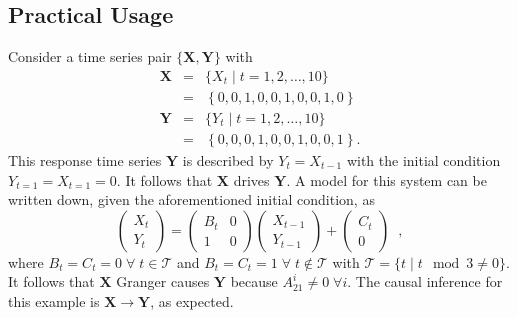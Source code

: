 \subsection{Practical Usage}
Consider a time series pair $\{\mathbf{X},\mathbf{Y}\}$ with
\begin{eqnarray*}
\mathbf{X} &=& \{X_t\; | \; t=1,2,\ldots,10\}\\
&=& \left\{0,0,1,0,0,1,0,0,1,0\right\}\\
\mathbf{Y} &=& \{Y_t\; | \; t=1,2,\ldots,10\}\\
&=& \left\{0,0,0,1,0,0,1,0,0,1\right\}.
\end{eqnarray*}
This response time series $\mathbf{Y}$ is described by $Y_t=X_{t-1}$ with the initial condition $Y_{t=1}=X_{t=1}=0$.  It follows that $\mathbf{X}$ drives $\mathbf{Y}$.  A model for this system can be written down, given the aforementioned initial condition, as
\begin{equation}
\label{eqn:GCsimpleex}
\begin{pmatrix}
X_t \\ 
Y_t
\end{pmatrix} = \begin{pmatrix}
B_t & 0\\
1 & 0
\end{pmatrix}\begin{pmatrix}
X_{t-1} \\ 
Y_{t-1}
\end{pmatrix}+
\begin{pmatrix}
C_t \\ 
0
\end{pmatrix}\;\;,
\end{equation}
where $B_t = C_t = 0\;\forall\;t\in \mathcal{T}$ and $B_t = C_t = 1\;\forall\;t\not\in \mathcal{T}$ with $\mathcal{T} = \{t\;|\;t\mod 3 \neq 0\}$.  It follows that $\mathbf{X}$ Granger causes $\mathbf{Y}$ because  $A_{21}^i\neq 0\;\forall i$.  The causal inference for this example is $\mathbf{X}\rightarrow\mathbf{Y}$, as expected.

